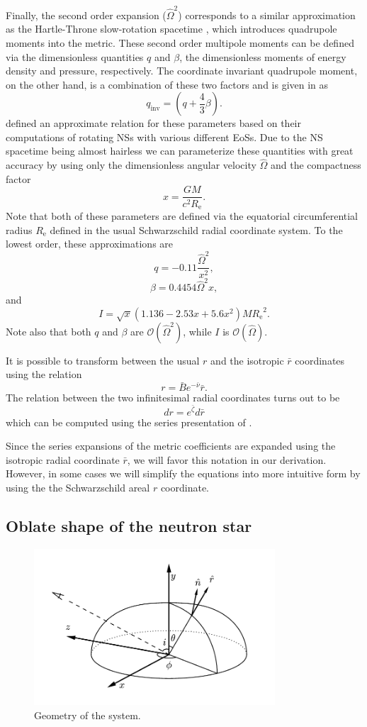 \documentclass[iop, usenatbib]{emulateapj}
\newcommand{\be}{\begin{equation}}
\newcommand{\ee}{\end{equation}}
\newcommand{\Req}{\ensuremath{R_{\mathrm{e}}}}
\newcommand{\sch}{Schwarzschild }
\newcommand{\rb}{\ensuremath{\bar{r}}}
\newcommand{\Ob}{\ensuremath{\hat{\Omega}}}
\newcommand{\nub}{\ensuremath{\bar{\nu}}}
\newcommand{\zetab}{\ensuremath{\bar{\zeta}}}
\newcommand{\Bb}{\ensuremath{\bar{B}}}
\newcommand{\qinv}{\ensuremath{q_{\mathrm{inv}}}}
\begin{document}
Finally, the second order expansion ($\Ob^2$) corresponds to a similar approximation as the Hartle-Throne slow-rotation spacetime \citep{HT68}, which introduces quadrupole moments into the metric.  
These second order multipole moments can be defined via the dimensionless quantities $q$ and $\beta$, the dimensionless moments of energy density and pressure, respectively.
The coordinate invariant quadrupole moment, on the other hand, is a combination of these two factors and is given in \citet{PA12} as
\be
\qinv = \left( q + \frac{4}{3} \beta \right).
\ee
\citet{aGM14} defined an approximate relation for these parameters based on their computations of rotating NSs with various different EoSs.  
Due to the NS spacetime being almost hairless we can parameterize these quantities with great accuracy by using only the dimensionless angular velocity $\Ob$ and the compactness factor
\be
x = \frac{G M}{c^2 \Req}.
\ee
Note that both of these parameters are defined via the equatorial circumferential radius $\Req$ defined in the usual \sch radial coordinate system.
To the lowest order, these approximations are
\be\label{eq:quad}
q = -0.11 \frac{\Ob^2}{x^2},
\ee
\be\label{eq:beta}
\beta = 0.4454 \Ob^2 x,
\ee
and
\be
I = \sqrt{x} (1.136 - 2.53 x + 5.6 x^2) M \Req^2.
\ee
Note also that both $q$ and $\beta$ are $\mathcal{O}(\Ob^2)$, while $I$ is $\mathcal{O}(\Ob)$.
    
It is possible to transform between the usual $r$ and the isotropic $\rb$ coordinates using the relation \citep{FIP86}
\be\label{eq:rb2r}
r = \Bb e^{-\nub} \rb.
\ee
The relation between the two infinitesimal radial coordinates turns out to be
\be\label{eq:drb2dr}
dr = e^{\zetab} d\rb
\ee
which can be computed using the series presentation of \cite{BI76}.

Since the series expansions of the metric coefficients are expanded using the isotropic radial coordinate $\rb$, we will favor this notation in our derivation.  
However, in some cases we will simplify the equations into more intuitive form by using the the Schwarzschild areal $r$ coordinate.


\subsection{Oblate shape of the neutron star}\label{sect:oblate}

\begin{figure}
\centering
\includegraphics[width=9cm]{figs/fig1.pdf}
\caption{\label{fig:geom}
  Geometry of the system.
}
\end{figure}
\end{document}
